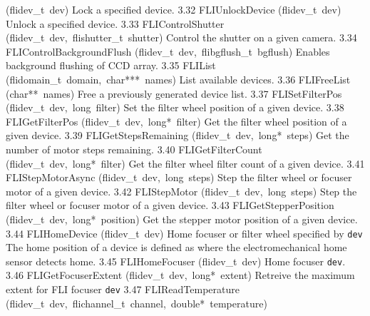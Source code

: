 \documentclass{article}
\begin{document}
\begin{cxxentry}
\begin{cxxnames}
        {(flidev\_t\ dev)}
        { Lock a specified device.}
        {3.32}
        {FLIUnlockDevice}
        {(flidev\_t\ dev)}
        { Unlock a specified device.}
        {3.33}
        {FLIControlShutter}
        {(flidev\_t\ dev,\ flishutter\_t\ shutter)}
        { Control the shutter on a given camera.}
        {3.34}
        {FLIControlBackgroundFlush}
        {(flidev\_t\ dev,\ flibgflush\_t\ bgflush)}
        { Enables background flushing of CCD array.}
        {3.35}
        {FLIList}
        {(flidomain\_t\ domain,\ char***\ names)}
        { List available devices.}
        {3.36}
        {FLIFreeList}
        {(char**\ names)}
        { Free a previously generated device list.}
        {3.37}
        {FLISetFilterPos}
        {(flidev\_t\ dev,\ long\ filter)}
        { Set the filter wheel position of a given device.}
        {3.38}
        {FLIGetFilterPos}
        {(flidev\_t\ dev,\ long*\ filter)}
        { Get the filter wheel position of a given device.}
        {3.39}
        {FLIGetStepsRemaining}
        {(flidev\_t\ dev,\ long*\ steps)}
        { Get the number of motor steps remaining.}
        {3.40}
        {FLIGetFilterCount}
        {(flidev\_t\ dev,\ long*\ filter)}
        { Get the filter wheel filter count of a given device.}
        {3.41}
        {FLIStepMotorAsync}
        {(flidev\_t\ dev,\ long\ steps)}
        { Step the filter wheel or focuser motor of a given device.}
        {3.42}
        {FLIStepMotor}
        {(flidev\_t\ dev,\ long\ steps)}
        { Step the filter wheel or focuser motor of a given device.}
        {3.43}
        {FLIGetStepperPosition}
        {(flidev\_t\ dev,\ long*\ position)}
        { Get the stepper motor position of a given device.}
        {3.44}
        {FLIHomeDevice}
        {(flidev\_t\ dev)}
        { Home focuser or filter wheel specified by \texttt{dev} The home position of a device is defined as where the electromechanical home sensor detects home.}
        {3.45}
        {FLIHomeFocuser}
        {(flidev\_t\ dev)}
        { Home focuser \texttt{dev}.}
        {3.46}
        {FLIGetFocuserExtent}
        {(flidev\_t\ dev,\ long*\ extent)}
        { Retreive the maximum extent for FLI focuser \texttt{dev}  }
        {3.47}
        {FLIReadTemperature}
        {(flidev\_t\ dev,\ flichannel\_t\ channel,\ double*\ temperature)}

\end{cxxnames}
\end{cxxentry}
\end{document}
